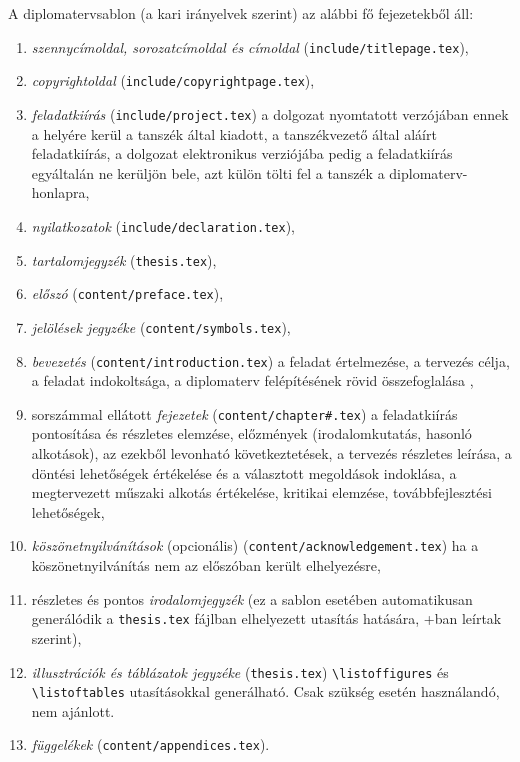 A diplomatervsablon (a kari irányelvek szerint) az alábbi fő fejezetekből áll:
\begin{enumerate}
	\item \emph{szennycímoldal, sorozatcímoldal és címoldal} (\verb+include/titlepage.tex+),
	\item \emph{copyrightoldal} (\verb+include/copyrightpage.tex+),
	\item \emph{feladatkiírás} (\verb+include/project.tex+) a dolgozat nyomtatott verzójában ennek a helyére kerül a tanszék által kiadott, a tanszékvezető által aláírt feladatkiírás, a dolgozat elektronikus verziójába pedig a feladatkiírás egyáltalán ne kerüljön bele, azt külön tölti fel a tanszék a diplomaterv-honlapra,
	\item \emph{nyilatkozatok} (\verb+include/declaration.tex+),
	\item \emph{tartalomjegyzék} (\verb+thesis.tex+),
	\item \emph{előszó} (\verb+content/preface.tex+),
	\item \emph{jelölések jegyzéke} (\verb+content/symbols.tex+),
	\item \emph{bevezetés} (\verb+content/introduction.tex+) a feladat értelmezése, a tervezés célja, a feladat indokoltsága, a diplomaterv felépítésének rövid összefoglalása ,
	\item sorszámmal ellátott \emph{fejezetek} (\verb+content/chapter#.tex+) a feladatkiírás pontosítása és részletes elemzése, előzmények (irodalomkutatás, hasonló alkotások), az ezekből levonható következtetések, a tervezés részletes leírása, a döntési lehetőségek értékelése és a választott megoldások indoklása, a megtervezett műszaki alkotás értékelése, kritikai elemzése, továbbfejlesztési lehetőségek, 
	\item \emph{köszönetnyilvánítások} (opcionális) (\verb+content/acknowledgement.tex+) ha a köszönetnyilvánítás nem az előszóban került elhelyezésre,
	\item részletes és pontos \emph{irodalomjegyzék} (ez a sablon esetében automatikusan generálódik a \verb+thesis.tex+ fájlban elhelyezett \verb++ utasítás hatására, \az+ban leírtak szerint),
	\item \emph{illusztrációk és táblázatok jegyzéke} (\verb+thesis.tex+) \verb+\listoffigures+ és \verb+\listoftables+ utasításokkal generálható. Csak szükség esetén használandó, nem ajánlott.
	\item \emph{függelékek} (\verb+content/appendices.tex+).
\end{enumerate}

